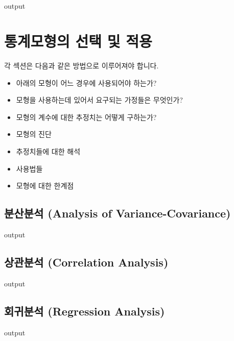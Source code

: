 \documentclass{report}
\begin{document}
\section{}
\begin{Schunk}
\begin{Soutput}
output
\end{Soutput}
\end{Schunk}

%
%
%

\chapter{통계모형의 선택 및 적용}

각 섹션은 다음과 같은 방법으로 이루어져야 합니다. 
\begin{itemize}
\item 아래의 모형이 어느 경우에 사용되어야 하는가?
\item 모형을 사용하는데 있어서 요구되는 가정들은 무엇인가?
\item 모형의 계수에 대한 추정치는 어떻게 구하는가?
\item 모형의 진단
\item 추정치들에 대한 해석
\item 사용법들 
\item 모형에 대한 한계점
\end{itemize}

\section{분산분석 (Analysis of Variance-Covariance)}
\begin{Schunk}
\begin{Soutput}
output
\end{Soutput}
\end{Schunk}

\section{상관분석 (Correlation Analysis) }
\begin{Schunk}
\begin{Soutput}
output
\end{Soutput}
\end{Schunk}

\section{회귀분석 (Regression Analysis) }
\begin{Schunk}
\begin{Soutput}
output
\end{Soutput}
\end{Schunk}
\end{document}
